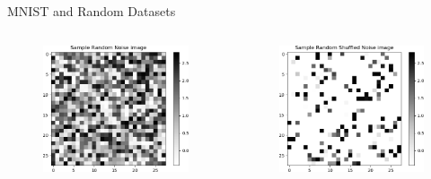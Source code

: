 \documentclass{beamer}
\begin{document}
\begin{frame}{MNIST and Random Datasets}
\begin{columns}
\begin{column}{.33\textwidth}
\begin{figure}
        \includegraphics[width=.99\textwidth]{images/mnist-behavior/Sample-random-noise.png}
    \end{figure}
    \end{column}
    \begin{column}{.33\textwidth}
    \begin{figure}
        \centering
        \includegraphics[width=.99\textwidth]{images/mnist-behavior/Sample-random-shuffled-noise.png}
    \end{figure}
    \end{column}
    \end{columns}
    
\end{frame}
\end{document}
